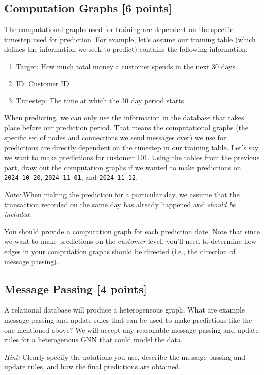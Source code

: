 \Solution{}

\subsection{Computation Graphs [6 points]}
The computational graphs used for training are dependent on the specific timestep used for prediction. For example, let’s assume our training table (which defines the information we seek to predict) contains the following information:
\begin{enumerate}
    \item[a.] Target: How much total money a customer spends in the next 30 days
    \item[b.] ID: Customer ID
    \item[c.] Timestep: The time at which the 30 day period starts
\end{enumerate}
When predicting, we can only use the information in the database that takes place before our prediction period. That means the computational graphs (the specific set of nodes and connections we send messages over) we use for predictions are directly dependent on the timestep in our training table. Let’s say we want to make predictions for customer 101. Using the tables from the previous part, draw out the computation graphs if we wanted to make predictions on \texttt{2024-10-20}, \texttt{2024-11-01}, and \texttt{2024-11-12}.

\emph{Note:} When making the prediction for a particular day, we assume that the transaction recorded on the same day has already happened and \emph{should be included}.

You should provide a computation graph for each prediction date. Note that since we want to make predictions on the \emph{customer} level, you'll need to determine how edges in your computation graphs should be directed (i.e., the direction of message passing).

\Solution{}

\subsection{Message Passing [4 points]}
 A relational database will produce a heterogeneous graph. What are example message passing and update rules that can be used to make predictions like the one mentioned above? We will accept any reasonable message passing and update rules for a heterogenous GNN that could model the data.

 \emph{Hint:} Clearly specify the notations you use, describe the message passing and update rules, and how the final predictions are obtained.

\Solution{}
